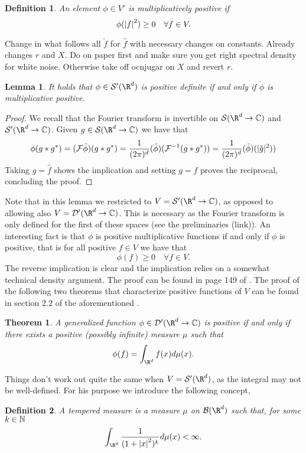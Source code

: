 \documentclass[12pt]{article}
\newtheorem{theorem}{Theorem}
\newtheorem{lemma}{Lemma}
\newtheorem{definition}{Definition}
\newcommand{\red}[1]{{\color{red}#1}}
\begin{document}
\begin{CJK*}{UTF8}{gbsn}
	\begin{definition}
		An element $\phi\in V'$ is \emph{multiplicatively positive} if
		\begin{equation*}
			\phi(\abs{f}^2)\geq 0\quad\forall f\in V.
		\end{equation*}
	\end{definition}
	\red{Change in what follows all $\check{f}$ for  $\hat{f}$ with necessary changes on constants. Already changes $r$ and  $X$. Do on paper first and make sure you get right spectral density for white noise. Otherwise take off ocnjugar on $X$ and revert  $r$.}
	\begin{lemma}
		It holds that $\phi\in \Ss'(\R^d)$ is positive definite if and only if $\check{\phi}$ is multiplicative positive.
	\end{lemma}
	\begin{proof}
		We recall that the Fourier transform is invertible on $\Ss(\R^d\to\C)$ and $\Ss'(\R^d\to\C)$. Given $g\in \Ss(\R^d\to\C)$ we have that
		\begin{equation*}
			\phi(g*g^*)=(\mathcal{F}\check{\phi})(g*g^*)=\frac{1}{(2\pi)^d}(\check{\phi})(\mathcal{F}^{-1}(g*g^*))=\frac{1}{(2\pi)^{d}}(\check{\phi})(|\check{g}|^2))
		\end{equation*}
		Taking $g=\hat{f}$ shows the implication and setting $g=f$ proves the reciprocal, concluding the proof.
	\end{proof}
	Note that in this lemma we restricted to $V=\Ss'(\R^d\to\C)$, as opposed to allowing also $V=\mathcal{D}'(\R^d\to\C)$. This is necessary as the Fourier transform is only defined for the first of these spaces (see the preliminaries (link)).
	An interesting fact is that $\phi$ is positive multiplicative functions if and only if $\phi$ is positive, that is for all positive $f \in V$ we have that
	\begin{equation*}
		\phi(f)\geq 0\quad\forall f\in V.
	\end{equation*}
	The reverse implication is clear and the implication relies on a somewhat technical density argument. The proof can be found in page 149 of \cite{gel2016generalized}. The proof of the following two theorems that characterize positive functions of $V$ can be found in section  $2.2$ of the aforementioned \cite{gel2016generalized}.
	\begin{theorem}\label{positivegives measure}
		A generalized function $\phi\in \mathcal{D}'(\R^d\to\C)$ is positive if and only if there exists a positive (possibly infinite) measure $\mu $ such that
		\begin{equation*}
			\phi(f)=\int_{\R^d} f(x)d\mu(x).
		\end{equation*}
	\end{theorem}
	Things don't work out quite the same when $V=\Ss'(\R^d)$, as the integral may not be well-defined. For his purpose we introduce the following concept,
	\begin{definition}
		A tempered measure is a measure $\mu$ on $\Bb(\R^d)$ such that, for some $k\in \mathbb{N}$
		\begin{equation*}
			\int_{\R^d} \frac{1}{(1+\abs{x}^2)^k}d \mu (x)<\infty .
		\end{equation*}


\end{definition}
\end{CJK*}
\end{document}
